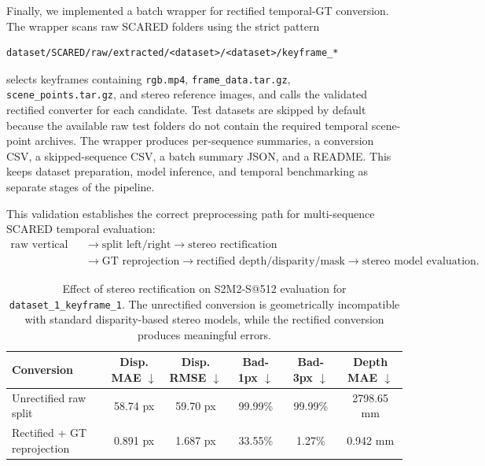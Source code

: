 \documentclass[11pt,a4paper]{article}
\begin{document}
Finally, we implemented a batch wrapper for rectified temporal-GT conversion. The wrapper scans raw SCARED folders using the strict pattern
\begin{verbatim}
dataset/SCARED/raw/extracted/<dataset>/<dataset>/keyframe_*
\end{verbatim}
selects keyframes containing \texttt{rgb.mp4}, \texttt{frame\_data.tar.gz}, \texttt{scene\_points.tar.gz}, and stereo reference images, and calls the validated rectified converter for each candidate. Test datasets are skipped by default because the available raw test folders do not contain the required temporal scene-point archives. The wrapper produces per-sequence summaries, a conversion CSV, a skipped-sequence CSV, a batch summary JSON, and a README. This keeps dataset preparation, model inference, and temporal benchmarking as separate stages of the pipeline.

This validation establishes the correct preprocessing path for multi-sequence SCARED temporal evaluation:
\begin{equation}
\begin{split}
    \text{raw vertical stereo video}
    &\rightarrow
    \text{split left/right}
    \rightarrow
    \text{stereo rectification} \\
    &\rightarrow
    \text{GT reprojection}
    \rightarrow
    \text{rectified depth/disparity/mask}
    \rightarrow
    \text{stereo model evaluation}.
\end{split}
\end{equation}

\begin{table}[t]
\centering
\caption{Effect of stereo rectification on S2M2-S@512 evaluation for \texttt{dataset\_1\_keyframe\_1}. The unrectified conversion is geometrically incompatible with standard disparity-based stereo models, while the rectified conversion produces meaningful errors.}
\label{tab:rectification_sanity_check}
\begin{tabular}{lccccc}
\toprule
Conversion &
Disp. MAE $\downarrow$ &
Disp. RMSE $\downarrow$ &
Bad-1px $\downarrow$ &
Bad-3px $\downarrow$ &
Depth MAE $\downarrow$ \\
\midrule
Unrectified raw split &
58.74 px &
59.70 px &
99.99\% &
99.99\% &
2798.65 mm \\
Rectified + GT reprojection &
0.891 px &
1.687 px &
33.55\% &
1.27\% &
0.942 mm \\
\bottomrule
\end{tabular}
\end{table}
\end{document}
